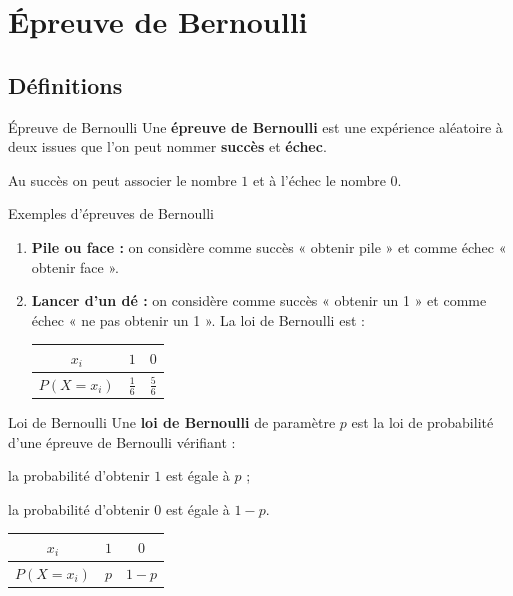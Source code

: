 \section{Épreuve de Bernoulli}

\subsection{Définitions}

\begin{defin}{Épreuve de Bernoulli}
	Une \textbf{épreuve de Bernoulli} est une expérience aléatoire à deux
	issues que l'on peut nommer \textbf{succès} et \textbf{échec}.
\end{defin}

\begin{rem}
	Au succès on peut associer le nombre $1$ et à l'échec le nombre $0$.
\end{rem}

\begin{ex}{Exemples d'épreuves de Bernoulli}
	\begin{enumerate}
		\item \textbf{Pile ou face :} on considère comme succès « obtenir pile »
		      et comme échec « obtenir face ».
		\item \textbf{Lancer d'un dé :} on considère comme succès « obtenir un 1 »
		      et comme échec « ne pas obtenir un 1 ». La loi de Bernoulli est :
		      \begin{center}
			      \begin{tabular}{|c|c|c|} \hline
				      $x_i$                             & $1$           & $0$           \\ \hline
				      \rule[-2mm]{0mm}{7mm}$P(X = x_i)$ & $\frac{1}{6}$ & $\frac{5}{6}$ \\ \hline
			      \end{tabular}
		      \end{center}
	\end{enumerate}
\end{ex}

\begin{defin}{Loi de Bernoulli}
	Une \textbf{loi de Bernoulli} de paramètre $p$ est la loi de probabilité
	d'une épreuve de Bernoulli vérifiant :
	\bi
	\item la probabilité d'obtenir $1$ est égale à $p$ ;
	\item la probabilité d'obtenir $0$ est égale à $1-p$.
	\ei

	\begin{center}
		\begin{tabular}{|c|c|c|} \hline
			$x_i$                             & $1$ & $0$     \\ \hline
			\rule[-2mm]{0mm}{7mm}$P(X = x_i)$ & $p$ & $1 - p$ \\ \hline
		\end{tabular}
	\end{center}
\end{defin}

